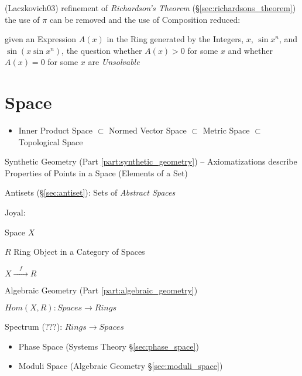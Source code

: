 (Laczkovich03) refinement of \emph{Richardson's Theorem}
(\S\ref{sec:richardsons_theorem}) the use of $\pi$ can be removed and the use
of Composition reduced:

given an Expression $A(x)$ in the Ring generated by the Integers, $x$, $\sin
x^n$, and $\sin(x \sin x^n)$, the question whether $A(x) > 0$ for some $x$ and
whether $A(x) = 0$ for some $x$ are \emph{Unsolvable}



\section{Space}\label{sec:space}

\begin{itemize}
  \item Inner Product Space \newline
    $\subset$ Normed Vector Space \newline
    $\subset$ Metric Space \newline
    $\subset$ Topological Space
\end{itemize}

Synthetic Geometry (Part \ref{part:synthetic_geometry}) -- Axiomatizations
describe Properties of Points in a Space (Elements of a Set)

Antisets (\S\ref{sec:antiset}): Sets of \emph{Abstract Spaces}

Joyal: %

Space $X$

$R$ Ring Object in a Category of Spaces

$X \xrightarrow{\quad f \quad} R$

Algebraic Geometry (Part \ref{part:algebraic_geometry})

$Hom(X,R) : Spaces \rightarrow Rings$

Spectrum (???): $Rings \rightarrow Spaces$

\begin{itemize}
  \item Phase Space (Systems Theory \S\ref{sec:phase_space})
  \item Moduli Space (Algebraic Geometry \S\ref{sec:moduli_space})
\end{itemize}



